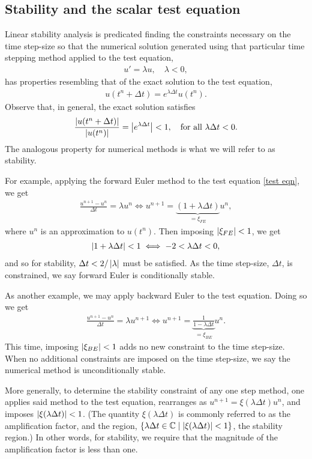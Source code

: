 \subsection{Stability and the scalar test equation}
Linear stability analysis is predicated finding the constraints necessary on the time step-size so that the numerical solution generated using that particular time stepping method applied to the test equation, 
\begin{align}
u' = \lambda u, 
\quad \lambda < 0,
\label{test eqn}
\end{align}  
has properties resembling that of the exact solution to the test equation,
\begin{align}
u(t^n + \Delta t) = e^{\lambda \Delta t} u(t^n).
\end{align}
Observe that, in general, the exact solution satisfies
\begin{align}
\frac{\left|u(t^n + \Delta t)\right|}{\left|u(t^n)\right|}
= \left|e^{\lambda\Delta t} \right| 
< 1,
\quad\text{for all } \lambda\Delta t < 0.
\end{align}
The analogous property for numerical methods is what we will refer to as stability.

For example, applying the forward Euler method to the test equation \cref{test eqn}, we get 
\begin{align}
\frac{u^{n+1} - u^n}{\Delta t} = \lambda u^n 
\iff u^{n+1} = \underbrace{(1 + \lambda \Delta t)}_{=\xi_{FE}} u^n, 
\end{align}
where $u^n$ is an approximation to $u(t^n)$. Then imposing $\left|\xi_{FE}\right| < 1$, we get 
\begin{align}
\left|1+ \lambda\Delta t\right| < 1 
\iff -2 < \lambda\Delta t < 0,
\end{align}
and so for stability, $\Delta t < 2/\left|\lambda\right|$ must be satisfied. As the time step-size, $\Delta t$, is constrained, we say forward Euler is conditionally stable. 

As another example, we may apply backward Euler to the test equation. Doing so we get 
\begin{align}
\frac{u^{n+1} - u^n}{\Delta t} = \lambda u^{n+1} 
\iff 
u^{n+1} = \underbrace{\frac{1}{1 - \lambda\Delta t}}_{=\xi_{BE}} u^n.
\end{align}
This time, imposing $\left|\xi_{BE}\right|<1$ adds no new constraint to the time step-size. When no additional constraints are imposed on the time step-size, we say the numerical method is unconditionally stable.

More generally, to determine the stability constraint of any one step method, one applies said method to the test equation, rearranges as $u^{n+1} = \xi(\lambda\Delta t) u^n$, and imposes $\left|\xi(\lambda\Delta t)\right| < 1$. (The quantity $\xi(\lambda\Delta t)$ is commonly referred to as the amplification factor, and the region, $\{\lambda\Delta t \in \mathbb{C} \mid \left|\xi(\lambda\Delta t)\right| < 1\}$, the stability region.) In other words, for stability, we require that the magnitude of the amplification factor is less than one.
 
